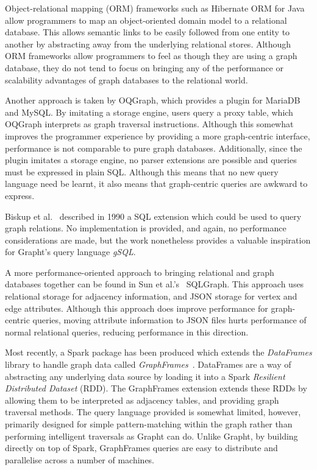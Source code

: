 Object-relational mapping (ORM) frameworks such as Hibernate ORM for Java
allow programmers to map an object-oriented domain model to a relational
database. This allows semantic links to be easily followed from one entity to
another by abstracting away from the underlying relational stores. Although
ORM frameworks allow programmers to feel as though they are using a graph
database, they do not tend to focus on bringing any of the performance or
scalability advantages of graph databases to the relational world.

Another approach is taken by OQGraph\cite{oqgraph}, which provides a plugin
for  MariaDB and MySQL. By imitating a storage engine, users query a proxy
table, which OQGraph interprets as graph traversal instructions. Although this
somewhat improves the programmer experience by providing a more graph-centric
interface, performance is not comparable to pure graph databases.
Additionally, since the plugin imitates a  storage engine, no parser
extensions are possible and queries must be expressed in  plain SQL. Although
this means that no new query language need be learnt, it also means that
graph-centric queries are awkward to express.

Biskup et al.~\cite{gSQL} described in 1990 a SQL extension which could be
used to  query graph relations. No implementation is provided, and again, no
performance considerations are made, but the work nonetheless provides a valuable 
inspiration for Grapht's query language \textit{gSQL}.

A more performance-oriented approach to bringing relational and graph
databases together can be found in Sun et
al.'s~\cite{Sun:2015:SER:2723372.2723732} SQLGraph. This approach uses
relational storage for adjacency information, and JSON storage for vertex and
edge attributes. Although this approach does improve performance for graph-
centric queries, moving attribute information to JSON files hurts performance
of normal relational queries, reducing performance in this direction.

Most recently, a Spark package has been produced which extends the
\textit{DataFrames} library to handle graph data called \textit{GraphFrames}~\cite{graphframes}.
DataFrames are a way of abstracting any underlying data source by loading it
into a Spark \textit{Resilient Distributed Dataset} (RDD). The GraphFrames
extension extends these RDDs by allowing them to be interpreted as adjacency
tables, and providing graph traversal methods. The query language provided is
somewhat limited, however, primarily designed for simple pattern-matching
within the graph rather than performing intelligent traversals as Grapht can
do. Unlike Grapht, by building directly on top of Spark, GraphFrames queries
are easy to distribute and parallelise across a number of machines.

